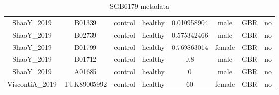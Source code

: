 \documentclass[11pt]{article}
\begin{document}
\begin{landscape}
\begin{table}[h]
\begin{center}
\begin{tabular}{|c|c|c|c|c|c|c|c|}
        ShaoY\_2019 & B01339 & control & healthy & 0.010958904 & male & GBR & no \\
        ShaoY\_2019 & B02739 & control & healthy & 0.575342466 & male & GBR & no  \\
        ShaoY\_2019 & B01799 & control & healthy & 0.769863014 & female & GBR & no  \\
        ShaoY\_2019 & B01712 & control & healthy & 0.8 & male & GBR & no \\
        ShaoY\_2019 & A01685 & control & healthy & 0 & male & GBR & no \\
        ViscontiA\_2019 & TUK89005992 & control & healthy & 60 & female & GBR & no \\
        \hline
    \end{tabular}\\
    \caption{SGB6179 metadata}
    \label{Table:SGB_metadata2}
\end{center}   
\end{table}
\end{landscape}
\end{document}
